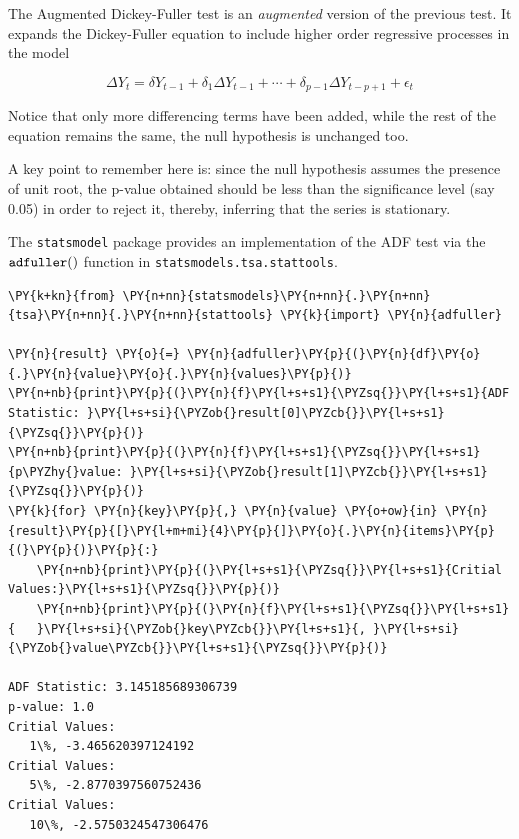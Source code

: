 The Augmented Dickey-Fuller test is an \emph{augmented} version of the
previous test. It expands the Dickey-Fuller equation
to include higher order regressive processes in the model

\[\Delta Y_t = \delta Y_{t-1} + \delta_1 \Delta Y_{t-1} + \cdots + \delta_{p-1} \Delta Y_{t-p+1} + \epsilon_t\]

Notice that only more differencing terms have been added, while the
rest of the equation remains the same, the null hypothesis
is unchanged too.

A key point to remember here is: since the null hypothesis assumes the
presence of unit root, the p-value obtained should be less than the
significance level (say 0.05) in order to reject it,
thereby, inferring that the series is stationary.

The \texttt{statsmodel} package provides an implementation of
the ADF test via the \(\tt{adfuller()}\) function in
\texttt{statsmodels.tsa.stattools}.

\begin{tcolorbox}[breakable, size=fbox, boxrule=1pt, pad at break*=1mm,colback=cellbackground, colframe=cellborder]
\begin{Verbatim}[commandchars=\\\{\}]
\PY{k+kn}{from} \PY{n+nn}{statsmodels}\PY{n+nn}{.}\PY{n+nn}{tsa}\PY{n+nn}{.}\PY{n+nn}{stattools} \PY{k}{import} \PY{n}{adfuller}

\PY{n}{result} \PY{o}{=} \PY{n}{adfuller}\PY{p}{(}\PY{n}{df}\PY{o}{.}\PY{n}{value}\PY{o}{.}\PY{n}{values}\PY{p}{)}
\PY{n+nb}{print}\PY{p}{(}\PY{n}{f}\PY{l+s+s1}{\PYZsq{}}\PY{l+s+s1}{ADF Statistic: }\PY{l+s+si}{\PYZob{}result[0]\PYZcb{}}\PY{l+s+s1}{\PYZsq{}}\PY{p}{)}
\PY{n+nb}{print}\PY{p}{(}\PY{n}{f}\PY{l+s+s1}{\PYZsq{}}\PY{l+s+s1}{p\PYZhy{}value: }\PY{l+s+si}{\PYZob{}result[1]\PYZcb{}}\PY{l+s+s1}{\PYZsq{}}\PY{p}{)}
\PY{k}{for} \PY{n}{key}\PY{p}{,} \PY{n}{value} \PY{o+ow}{in} \PY{n}{result}\PY{p}{[}\PY{l+m+mi}{4}\PY{p}{]}\PY{o}{.}\PY{n}{items}\PY{p}{(}\PY{p}{)}\PY{p}{:}
    \PY{n+nb}{print}\PY{p}{(}\PY{l+s+s1}{\PYZsq{}}\PY{l+s+s1}{Critial Values:}\PY{l+s+s1}{\PYZsq{}}\PY{p}{)}
    \PY{n+nb}{print}\PY{p}{(}\PY{n}{f}\PY{l+s+s1}{\PYZsq{}}\PY{l+s+s1}{   }\PY{l+s+si}{\PYZob{}key\PYZcb{}}\PY{l+s+s1}{, }\PY{l+s+si}{\PYZob{}value\PYZcb{}}\PY{l+s+s1}{\PYZsq{}}\PY{p}{)}

ADF Statistic: 3.145185689306739
p-value: 1.0
Critial Values:
   1\%, -3.465620397124192
Critial Values:
   5\%, -2.8770397560752436
Critial Values:
   10\%, -2.5750324547306476
\end{Verbatim}
\end{tcolorbox}

